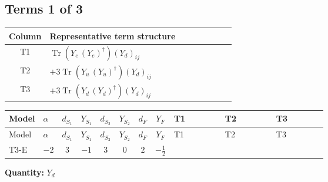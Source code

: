 \documentclass[8pt]{article}
\begin{document}
\begin{landscape}
\subsection*{Terms 1 of 3}
\begin{center}
\begin{tabular}{@{}c >{\raggedright\arraybackslash}p{0.82\linewidth}@{}}
\toprule
Column & Representative term structure \\
\midrule
T1 & \(\displaystyle \operatorname{Tr}\!\left({Y_e}\,\left({Y_e}\right)^{\dagger}\right) \left({Y_d}\right)_{ij}\) \\
\midrule
T2 & \(\displaystyle +3 \operatorname{Tr}\!\left({Y_u}\,\left({Y_u}\right)^{\dagger}\right) \left({Y_d}\right)_{ij}\) \\
\midrule
T3 & \(\displaystyle +3 \operatorname{Tr}\!\left({Y_d}\,\left({Y_d}\right)^{\dagger}\right) \left({Y_d}\right)_{ij}\) \\
\midrule
\bottomrule
\end{tabular}
\end{center}
\smallskip
\tiny
\begin{longtable}{@{}llcccccc >{\raggedright\arraybackslash}p{0.21\linewidth} >{\raggedright\arraybackslash}p{0.21\linewidth} >{\raggedright\arraybackslash}p{0.21\linewidth}@{}}
\toprule
Model & $\alpha$ & $d_{S_1}$ & $Y_{S_1}$ & $d_{S_2}$ & $Y_{S_2}$ & $d_F$ & $Y_F$ & T1 & T2 & T3 \\
\midrule
\endfirsthead
\toprule
Model & $\alpha$ & $d_{S_1}$ & $Y_{S_1}$ & $d_{S_2}$ & $Y_{S_2}$ & $d_F$ & $Y_F$ & T1 & T2 & T3 \\
\midrule
\endhead
T3-E & $-2$ & $3$ & $-1$ & $3$ & $0$ & $2$ & $-\frac{1}{2}$ & \scriptsize\adjustbox{max width=\linewidth}{$\begin{gathered} \operatorname{Tr}\!\left({Y_e}\,\left({Y_e}\right)^{\dagger}\right) \left({Y_d}\right)_{ij}\end{gathered}$} & \scriptsize\adjustbox{max width=\linewidth}{$\begin{gathered} +3 \operatorname{Tr}\!\left({Y_u}\,\left({Y_u}\right)^{\dagger}\right) \left({Y_d}\right)_{ij}\end{gathered}$} & \scriptsize\adjustbox{max width=\linewidth}{$\begin{gathered} +3 \operatorname{Tr}\!\left({Y_d}\,\left({Y_d}\right)^{\dagger}\right) \left({Y_d}\right)_{ij}\end{gathered}$} \\
\midrule
\bottomrule
\end{longtable}
\clearpage
\noindent\textbf{Quantity: }$Y_d$\par\smallskip

\end{landscape}
\end{document}
